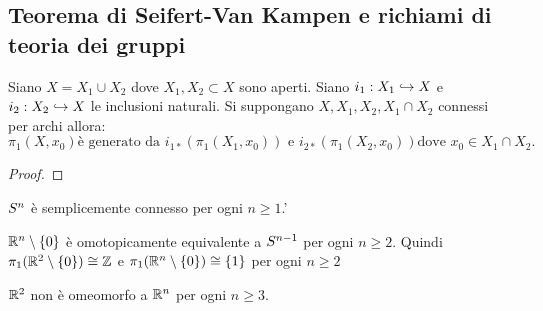 \documentclass[]{article}
\begin{document}
\subsection{Teorema di Seifert-Van Kampen e richiami di teoria dei gruppi}

\begin{theorem}  \nl
    Siano $X = X_1 \cup X_2$ dove $X_1, X_2 \subset X$ sono aperti. Siano $i_1: X_1 \hookrightarrow X$ e $i_2: X_2 \hookrightarrow X$ le inclusioni naturali. \nl
    Si suppongano $X, X_1, X_2, X_1 \cap X_2$ connessi per archi allora:
    \[
        \pi_1(X, x_0) \text{\`e generato da } i_{1*}\left(\pi_1\left(X_1, x_0\right)\right) \text{ e } i_{2*}\left(\pi_1\left(X_2, x_0\right)\right) \text{dove } x_0 \in X_1 \cap X_2.
    \]
\end{theorem}

\begin{proof}

\end{proof}

\begin{corollary} \nl
    $S^{n}$ \`e semplicemente connesso per ogni $n \geq 1$.'
\end{corollary}

\begin{corollary} \nl
    $\mathbb{R}^n \setminus \left\{ 0 \right\}$ \`e omotopicamente equivalente a $S^{n-1}$ per ogni $n \geq 2$. \nl
    Quindi $\pi_1(\mathbb{R}^2 \setminus \left\{ 0 \right\}) \cong \mathbb{Z}$ e $\pi_1(\mathbb{R}^n \setminus \left\{ 0 \right\}) \cong \left\{ 1 \right\}$ per ogni $n \geq 2$
\end{corollary}

\begin{corollary} \nl
    $\mathbb{R}^2$ non \`e omeomorfo a $\mathbb{R}^n$ per ogni $n \geq 3$.
\end{corollary}
\end{document}
